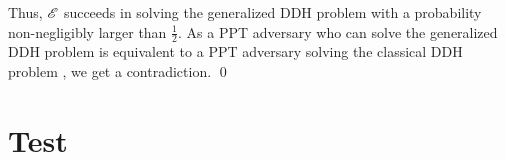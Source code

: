 Thus, $\mathscr{E}$ succeeds in solving the generalized DDH problem with a probability non-negligibly larger than $\frac{1}{2}$. As a \textsf{PPT} adversary who can solve the generalized DDH problem is equivalent to a \textsf{PPT} adversary solving the classical DDH problem \cite{Bao2003}, we get a contradiction. \hfill{\small \qed}



\chapter{Test}